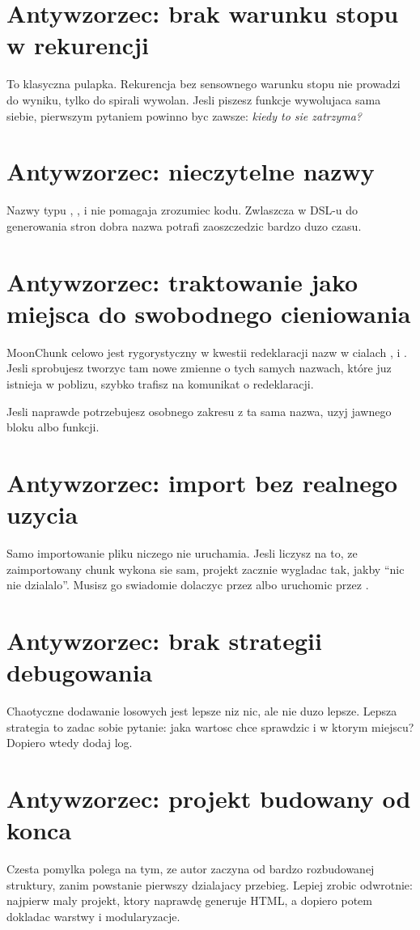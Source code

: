 \section{Antywzorzec: brak warunku stopu w rekurencji}
To klasyczna pulapka. Rekurencja bez sensownego warunku stopu nie prowadzi do wyniku,
tylko do spirali wywolan. Jesli piszesz funkcje wywolujaca sama siebie, pierwszym pytaniem
powinno byc zawsze: \emph{kiedy to sie zatrzyma?}

\section{Antywzorzec: nieczytelne nazwy}
Nazwy typu , ,  i  nie pomagaja zrozumiec kodu.
Zwlaszcza w DSL-u do generowania stron dobra nazwa potrafi zaoszczedzic bardzo duzo czasu.

\section{Antywzorzec: traktowanie  jako miejsca do swobodnego cieniowania}
MoonChunk celowo jest rygorystyczny w kwestii redeklaracji nazw w cialach ,
 i . Jesli sprobujesz tworzyc tam nowe zmienne o tych samych nazwach,
które juz istnieja w poblizu, szybko trafisz na komunikat o redeklaracji.

Jesli naprawde potrzebujesz osobnego zakresu z ta sama nazwa, uzyj jawnego bloku
 albo funkcji.

\section{Antywzorzec: import bez realnego uzycia}
Samo importowanie pliku niczego nie uruchamia. Jesli liczysz na to, ze zaimportowany
chunk wykona sie sam, projekt zacznie wygladac tak, jakby ``nic nie dzialalo''.
Musisz go swiadomie dolaczyc przez  albo uruchomic przez .

\section{Antywzorzec: brak strategii debugowania}
Chaotyczne dodawanie losowych  jest lepsze niz nic, ale nie duzo lepsze.
Lepsza strategia to zadac sobie pytanie: jaka wartosc chce sprawdzic i w ktorym miejscu?
Dopiero wtedy dodaj log.

\section{Antywzorzec: projekt budowany od konca}
Czesta pomylka polega na tym, ze autor zaczyna od bardzo rozbudowanej struktury, zanim
powstanie pierwszy dzialajacy przebieg. Lepiej zrobic odwrotnie: najpierw maly projekt,
ktory naprawdę generuje HTML, a dopiero potem dokladac warstwy i modularyzacje.
